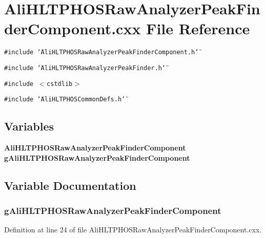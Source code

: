 \section{Ali\-HLTPHOSRaw\-Analyzer\-Peak\-Finder\-Component.cxx File Reference}
\label{AliHLTPHOSRawAnalyzerPeakFinderComponent_8cxx}


{\tt \#include \char`\"{}Ali\-HLTPHOSRaw\-Analyzer\-Peak\-Finder\-Component.h\char`\"{}}\par
{\tt \#include \char`\"{}Ali\-HLTPHOSRaw\-Analyzer\-Peak\-Finder.h\char`\"{}}\par
{\tt \#include $<$cstdlib$>$}\par
{\tt \#include \char`\"{}Ali\-HLTPHOSCommon\-Defs.h\char`\"{}}\par
\subsection*{Variables}
\begin{CompactItemize}
\item 
{\bf Ali\-HLTPHOSRaw\-Analyzer\-Peak\-Finder\-Component} {\bf g\-Ali\-HLTPHOSRaw\-Analyzer\-Peak\-Finder\-Component}
\end{CompactItemize}


\subsection{Variable Documentation}
\subsubsection{ {\bf g\-Ali\-HLTPHOSRaw\-Analyzer\-Peak\-Finder\-Component}}\label{AliHLTPHOSRawAnalyzerPeakFinderComponent_8cxx_a0}




Definition at line 24 of file Ali\-HLTPHOSRaw\-Analyzer\-Peak\-Finder\-Component.cxx.